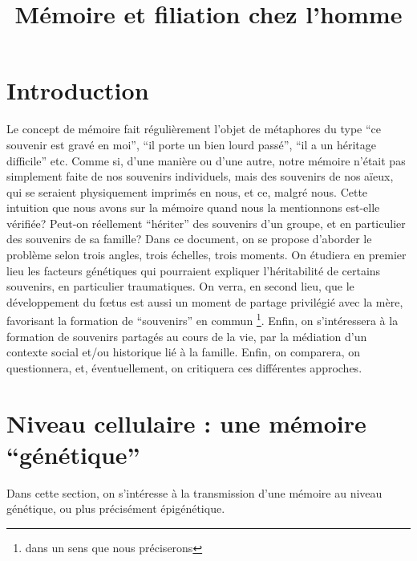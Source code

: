 \documentclass[french]{article}
\title{Mémoire et filiation chez l'homme}
\begin{document}
	\maketitle
	\section*{Introduction}
		Le concept de mémoire fait régulièrement l'objet de métaphores du type ``ce souvenir est gravé en moi'', ``il porte un bien lourd passé'', ``il a un héritage difficile'' etc. Comme si, d'une manière ou d'une autre, notre mémoire n'était pas simplement faite de nos souvenirs individuels, mais des souvenirs de nos aïeux, qui se seraient physiquement imprimés en nous, et ce, malgré nous. Cette intuition que nous avons sur la mémoire quand nous la mentionnons est-elle vérifiée? Peut-on réellement ``hériter'' des souvenirs d'un groupe, et en particulier des souvenirs de sa famille? Dans ce document, on se propose d'aborder le problème selon trois angles, trois échelles, trois moments. On étudiera en premier lieu les facteurs génétiques qui pourraient expliquer l'héritabilité de certains souvenirs, en particulier traumatiques. On verra, en second lieu, que le développement du fœtus est aussi un moment de partage privilégié avec la mère, favorisant la formation de ``souvenirs'' en commun \footnote{dans un sens que nous préciserons}. Enfin, on s'intéressera à la formation de souvenirs partagés au cours de la vie, par la médiation d'un contexte social et/ou historique lié à la famille. Enfin, on comparera, on questionnera, et, éventuellement, on critiquera ces différentes approches.
		\section{Niveau cellulaire : une mémoire ``génétique''}\label{genetique}
			Dans cette section, on s'intéresse à la transmission d'une mémoire au niveau génétique, ou plus précisément épigénétique.
\end{document}
